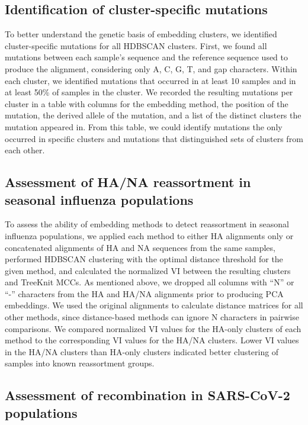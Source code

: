 \documentclass[10pt,letterpaper]{article}
\begin{document}
\subsection*{Identification of cluster-specific mutations}

To better understand the genetic basis of embedding clusters, we identified cluster-specific mutations for all HDBSCAN clusters.
First, we found all mutations between each sample's sequence and the reference sequence used to produce the alignment, considering only A, C, G, T, and gap characters.
Within each cluster, we identified mutations that occurred in at least 10 samples and in at least 50\% of samples in the cluster.
We recorded the resulting mutations per cluster in a table with columns for the embedding method, the position of the mutation, the derived allele of the mutation, and a list of the distinct clusters the mutation appeared in.
From this table, we could identify mutations the only occurred in specific clusters and mutations that distinguished sets of clusters from each other.

\subsection*{Assessment of HA/NA reassortment in seasonal influenza populations}

To assess the ability of embedding methods to detect reassortment in seasonal influenza populations, we applied each method to either HA alignments only or concatenated alignments of HA and NA sequences from the same samples, performed HDBSCAN clustering with the optimal distance threshold for the given method, and calculated the normalized VI between the resulting clusters and TreeKnit MCCs.
As mentioned above, we dropped all columns with ``N'' or ``-'' characters from the HA and HA/NA alignments prior to producing PCA embeddings.
We used the original alignments to calculate distance matrices for all other methods, since distance-based methods can ignore N characters in pairwise comparisons.
We compared normalized VI values for the HA-only clusters of each method to the corresponding VI values for the HA/NA clusters.
Lower VI values in the HA/NA clusters than HA-only clusters indicated better clustering of samples into known reassortment groups.

\subsection*{Assessment of recombination in SARS-CoV-2 populations}
\end{document}
